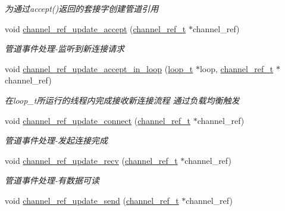 \begin{DoxyCompactItemize}
\begin{DoxyCompactList}\small\item\em 为通过accept()返回的套接字创建管道引用 \end{DoxyCompactList}\item 
void \hyperlink{a00041_a31545bffe4e0837eaf754465732642c4_a31545bffe4e0837eaf754465732642c4}{channel\+\_\+ref\+\_\+update\+\_\+accept} (\hyperlink{a00044_a151271c9d188ef28d4d24bb81dcc1263_a151271c9d188ef28d4d24bb81dcc1263}{channel\+\_\+ref\+\_\+t} $\ast$channel\+\_\+ref)
\begin{DoxyCompactList}\small\item\em 管道事件处理-\/监听到新连接请求 \end{DoxyCompactList}\item 
void \hyperlink{a00041_af2b04a39619b524c176a1b921a2a662d_af2b04a39619b524c176a1b921a2a662d}{channel\+\_\+ref\+\_\+update\+\_\+accept\+\_\+in\+\_\+loop} (\hyperlink{a00044_a9c3ad1cd2de83e09f3a7b59fa82c94ee_a9c3ad1cd2de83e09f3a7b59fa82c94ee}{loop\+\_\+t} $\ast$loop, \hyperlink{a00044_a151271c9d188ef28d4d24bb81dcc1263_a151271c9d188ef28d4d24bb81dcc1263}{channel\+\_\+ref\+\_\+t} $\ast$channel\+\_\+ref)
\begin{DoxyCompactList}\small\item\em 在loop\+\_\+t所运行的线程内完成接收新连接流程 通过负载均衡触发 \end{DoxyCompactList}\item 
void \hyperlink{a00041_ac3dee255a82a9d1fb1fc3c63a2905a5a_ac3dee255a82a9d1fb1fc3c63a2905a5a}{channel\+\_\+ref\+\_\+update\+\_\+connect} (\hyperlink{a00044_a151271c9d188ef28d4d24bb81dcc1263_a151271c9d188ef28d4d24bb81dcc1263}{channel\+\_\+ref\+\_\+t} $\ast$channel\+\_\+ref)
\begin{DoxyCompactList}\small\item\em 管道事件处理-\/发起连接完成 \end{DoxyCompactList}\item 
void \hyperlink{a00041_a1c47df1906826a2a5b6d99fbc51918d1_a1c47df1906826a2a5b6d99fbc51918d1}{channel\+\_\+ref\+\_\+update\+\_\+recv} (\hyperlink{a00044_a151271c9d188ef28d4d24bb81dcc1263_a151271c9d188ef28d4d24bb81dcc1263}{channel\+\_\+ref\+\_\+t} $\ast$channel\+\_\+ref)
\begin{DoxyCompactList}\small\item\em 管道事件处理-\/有数据可读 \end{DoxyCompactList}\item 
void \hyperlink{a00041_ae7b781b5faec09b7bd383e4e59dfb40f_ae7b781b5faec09b7bd383e4e59dfb40f}{channel\+\_\+ref\+\_\+update\+\_\+send} (\hyperlink{a00044_a151271c9d188ef28d4d24bb81dcc1263_a151271c9d188ef28d4d24bb81dcc1263}{channel\+\_\+ref\+\_\+t} $\ast$channel\+\_\+ref)

\end{DoxyCompactItemize}
